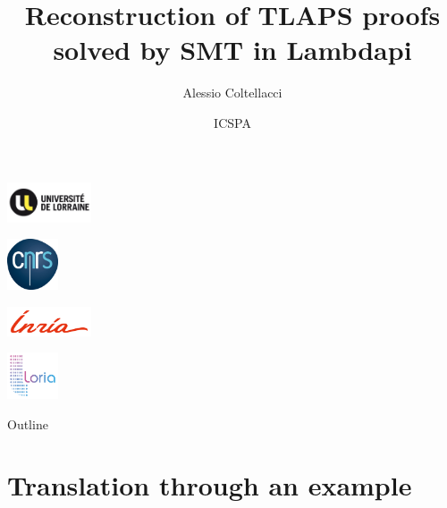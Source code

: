 \documentclass[aspectratio=169,xcolor={dvipsnames}]{beamer}
\title{Reconstruction of TLAPS proofs\\ solved by SMT in Lambdapi}
\author[A.~Colt]{%
  Alessio Coltellacci
}
\institute[]{\small%
  Univ. Lorraine, CNRS, Inria, Loria
}
\date[]{%
  ICSPA
}
\begin{document}
\begin{frame}
  \titlepage
  \centering
    \begin{minipage}{.18\textwidth}
        \includegraphics[width=2.5cm]{ul_logo.png}
    \end{minipage}%
    \begin{minipage}{.12\textwidth}
        \includegraphics[width=1.5cm]{cnrs.png}
    \end{minipage}%
    \begin{minipage}{.18\textwidth}
        \includegraphics[width=2.5cm]{inria-logo.png}
    \end{minipage}%
    \begin{minipage}{.12\textwidth}
        \includegraphics[width=1.5cm]{loria-logo.png}
    \end{minipage}%
\end{frame}

\begin{frame}{Outline}
    \tableofcontents
\end{frame}

\section{Translation through an example}

\AtBeginSection[]
{
  \begin{frame}
    \tableofcontents[currentsection]
  \end{frame}
}
\end{document}
